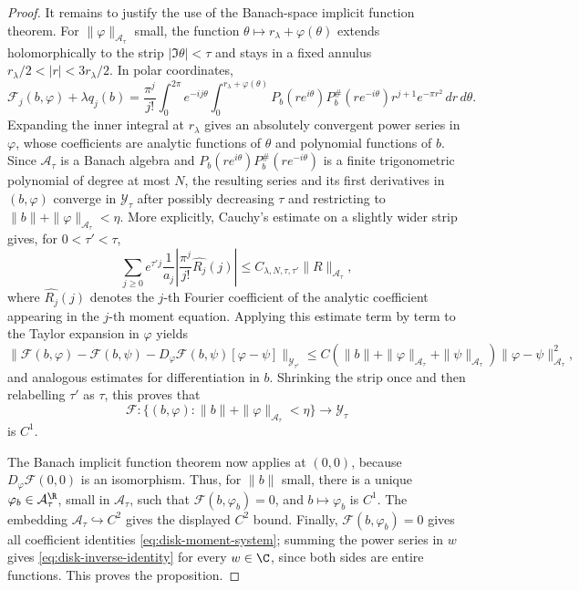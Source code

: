 \begin{proof}
It remains to justify the use of the Banach-space implicit function theorem.
For \(\|\varphi\|_{\mathcal A_\tau}\) small, the function
\(\theta\mapsto r_\lambda+\varphi(\theta)\) extends holomorphically to the
strip \(|\Im\theta|<\tau\) and stays in a fixed annulus
\(r_\lambda/2<|r|<3r_\lambda/2\). In polar coordinates,
\[
\mathcal F_j(b,\varphi)+\lambda q_j(b)
=
\frac{\pi^j}{j!}\int_0^{2\pi}e^{-ij\theta}
\int_0^{r_\lambda+\varphi(\theta)}
P_b(re^{i\theta})P_b^\#(re^{-i\theta})r^{j+1}e^{-\pi r^2}\,dr\,d\theta .
\]
Expanding the inner integral at \(r_\lambda\) gives an absolutely convergent
power series in \(\varphi\), whose coefficients are analytic functions of
\(\theta\) and polynomial functions of \(b\). Since \(\mathcal A_\tau\) is a
Banach algebra and \(P_b(re^{i\theta})P_b^\#(re^{-i\theta})\) is a finite
trigonometric polynomial of degree at most \(N\), the resulting series and
its first derivatives in \((b,\varphi)\) converge in \(\mathcal Y_\tau\) after
possibly decreasing \(\tau\) and restricting to
\(\|b\|+\|\varphi\|_{\mathcal A_\tau}<\eta\). More explicitly, Cauchy's
estimate on a slightly wider strip gives, for \(0<\tau'<\tau\),
\[
\sum_{j\ge0}e^{\tau' j}\frac1{a_j}
\left|
\frac{\pi^j}{j!}\widehat{R_j}(j)
\right|
\le
C_{\lambda,N,\tau,\tau'}\|R\|_{\mathcal A_\tau},
\]
where \(\widehat{R_j}(j)\) denotes the \(j\)-th Fourier coefficient of the
analytic coefficient appearing in the \(j\)-th moment equation. Applying this
estimate term by term to the Taylor expansion in \(\varphi\) yields
\[
\|\mathcal F(b,\varphi)-\mathcal F(b,\psi)
-D_\varphi\mathcal F(b,\psi)[\varphi-\psi]\|_{\mathcal Y_{\tau'}}
\le
C(\|b\|+\|\varphi\|_{\mathcal A_\tau}
+\|\psi\|_{\mathcal A_\tau})
\|\varphi-\psi\|_{\mathcal A_\tau}^2,
\]
and analogous estimates for differentiation in \(b\). Shrinking the strip
once and then relabelling \(\tau'\) as \(\tau\), this proves that
\[
\mathcal F:
\{(b,\varphi):\|b\|+\|\varphi\|_{\mathcal A_\tau}<\eta\}
\longrightarrow \mathcal Y_\tau
\]
is \(C^1\).

The Banach implicit function theorem now applies at \((0,0)\), because
\(D_\varphi\mathcal F(0,0)\) is an isomorphism. Thus, for \(\|b\|\) small,
there is a unique \(\varphi_b\in\mathcal A_\tau^\R\), small in
\(\mathcal A_\tau\), such that \(\mathcal F(b,\varphi_b)=0\), and
\(b\mapsto\varphi_b\) is \(C^1\). The embedding
\(\mathcal A_\tau\hookrightarrow C^2\) gives the displayed \(C^2\) bound.
Finally, \(\mathcal F(b,\varphi_b)=0\) gives all coefficient identities
\eqref{eq:disk-moment-system}; summing the power series in \(w\) gives
\eqref{eq:disk-inverse-identity} for every \(w\in\C\), since both sides are
entire functions. This proves the proposition.
\end{proof}


